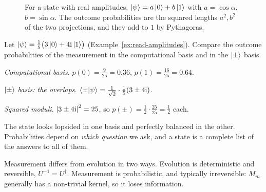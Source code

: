 \begin{figure}[htb]
  \centering
  \caption{For a state with real amplitudes, $\left|\psi\right\rangle=a\left|0\right\rangle+b\left|1\right\rangle$ with $a=\cos\alpha$, $b=\sin\alpha$. The outcome probabilities are the squared lengths $a^2,b^2$ of the two projections, and they add to $1$ by Pythagoras.}
  \label{fig:meas-qubit}
\end{figure}

\begin{example}\label{ex:two-bases}
  Let $\left|\psi\right\rangle=\tfrac15\bigl(3\left|0\right\rangle+4\mathrm{i}\left|1\right\rangle\bigr)$ (Example~\ref{ex:read-amplitudes}). Compare the outcome probabilities of the measurement in the computational basis and in the $\left|\pm\right\rangle$ basis.
\end{example}
\begin{solution}
  \begin{steps}
    \item \emph{Computational basis.} $p(0)=\tfrac9{25}=0.36$, $p(1)=\tfrac{16}{25}=0.64$.
    \item \emph{$\left|\pm\right\rangle$ basis: the overlaps.} $\left\langle\pm\middle|\psi\right\rangle=\tfrac1{\sqrt2}\cdot\tfrac15(3\pm4\mathrm{i})$.
    \item \emph{Squared moduli.} $\left|3\pm4\mathrm{i}\right|^2=25$, so $p(\pm)=\tfrac1{2}\cdot\tfrac{25}{25}=\tfrac12$ each.
  \end{steps}
  The state looks lopsided in one basis and perfectly balanced in the other. Probabilities depend on \emph{which question} we ask, and a state is a complete list of the answers to all of them.
\end{solution}

Measurement differs from evolution in two ways. Evolution is deterministic and reversible, $U^{-1}=U^\dagger$. Measurement is probabilistic, and typically irreversible: $M_m$ generally has a non-trivial kernel, so it loses information.

